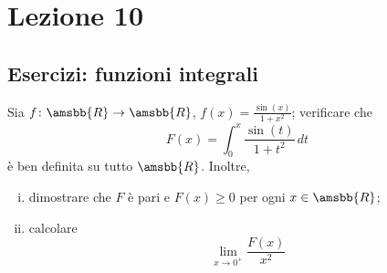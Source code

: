 \section{Lezione 10}
\subsection{Esercizi: funzioni integrali}
\begin{exercise}
    \label{ex:9.1}
    Sia $f\colon\amsbb{R}\to \amsbb{R}$, $f(x) = \frac{\sin(x)}{1+x^2}$; verificare che
    \[
    F(x) = \int_0^x \frac{\sin(t)}{1+t^2}\, dt
    \]
    è ben definita su tutto $\amsbb{R}$. Inoltre,
    \begin{enumerate}[(i)]
        \item dimostrare che $F$ è pari e $F(x)\ge 0$ per ogni $x\in\amsbb{R}$;
        \item calcolare 
        \[
        \lim_{x\to 0^+} \frac{F(x)}{x^2}
        \]
    \end{enumerate}
\end{exercise}
